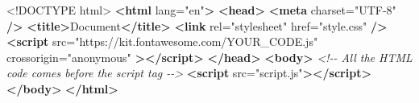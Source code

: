 \documentclass[
]{book}
\newenvironment{Shaded}{\begin{snugshade}}{\end{snugshade}}
\newcommand{\CommentTok}[1]{\textcolor[rgb]{0.56,0.35,0.01}{\textit{#1}}}
\newcommand{\DataTypeTok}[1]{\textcolor[rgb]{0.13,0.29,0.53}{#1}}
\newcommand{\KeywordTok}[1]{\textcolor[rgb]{0.13,0.29,0.53}{\textbf{#1}}}
\newcommand{\NormalTok}[1]{#1}
\newcommand{\OtherTok}[1]{\textcolor[rgb]{0.56,0.35,0.01}{#1}}
\newcommand{\StringTok}[1]{\textcolor[rgb]{0.31,0.60,0.02}{#1}}
\begin{document}
\begin{Shaded}
\begin{Highlighting}[]
\DataTypeTok{\textless{}!DOCTYPE }\NormalTok{html}\DataTypeTok{\textgreater{}}
\KeywordTok{\textless{}html}\OtherTok{ lang=}\StringTok{"en"}\KeywordTok{\textgreater{}}
  \KeywordTok{\textless{}head\textgreater{}}
    \KeywordTok{\textless{}meta}\OtherTok{ charset=}\StringTok{"UTF{-}8"} \KeywordTok{/\textgreater{}}
    \KeywordTok{\textless{}title\textgreater{}}\NormalTok{Document}\KeywordTok{\textless{}/title\textgreater{}}
    \KeywordTok{\textless{}link}\OtherTok{ rel=}\StringTok{"stylesheet"}\OtherTok{ href=}\StringTok{"style.css"} \KeywordTok{/\textgreater{}}
    \KeywordTok{\textless{}script}
\OtherTok{      src=}\StringTok{"https://kit.fontawesome.com/YOUR\_CODE.js"}
\OtherTok{      crossorigin=}\StringTok{"anonymous"}
    \KeywordTok{\textgreater{}\textless{}/script\textgreater{}}
  \KeywordTok{\textless{}/head\textgreater{}}
  \KeywordTok{\textless{}body\textgreater{}}
    \CommentTok{\textless{}!{-}{-} All the HTML code comes before the script tag {-}{-}\textgreater{}}
    \KeywordTok{\textless{}script}\OtherTok{ src=}\StringTok{"script.js"}\KeywordTok{\textgreater{}\textless{}/script\textgreater{}}
  \KeywordTok{\textless{}/body\textgreater{}}
\KeywordTok{\textless{}/html\textgreater{}}
\end{Highlighting}
\end{Shaded}


  
\end{document}
